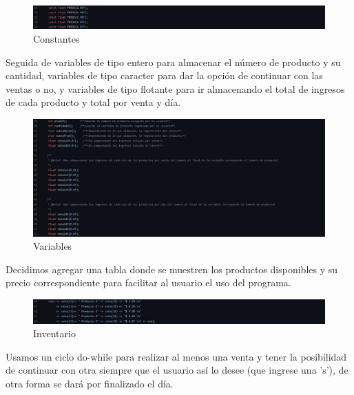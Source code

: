 \documentclass[12pt, letterpaper]{article}
\begin{document}
    \begin{figure}[h]
    \centering
    \includegraphics[width=16cm]{constantes.jpg}
    \caption {Constantes \label{fig:Fig4}}
    \end{figure}

    \vspace{0.8cm}
    
    Seguida de variables de tipo entero para almacenar el número de producto y su cantidad, variables de tipo caracter para dar la opción de continuar con las ventas o no, y variables de tipo flotante para ir almacenando el total de ingresos de cada producto y total por venta y día. 
    
    \begin{figure}[h]
    \centering
    \includegraphics[width=16cm]{variables.jpg}
    \caption {Variables \label{fig:Fig5}}
    \end{figure}
    
    \vspace{0.8cm}
    
    Decidimos agregar una tabla donde se muestren los productos disponibles y su precio correspondiente para facilitar al usuario el uso del programa.
    
    \begin{figure}[h]
    \centering
    \includegraphics[width=16cm]{tabla.jpg}
    \caption {Inventario \label{fig:Fig6}}
    \end{figure}
    
    \vspace{0.8cm}
    
    Usamos un ciclo do-while para realizar al menos una venta y tener la posibilidad de continuar con otra siempre que el usuario así lo desee (que ingrese una 's'), de otra forma se dará por finalizado el día.
    
\end{document}
